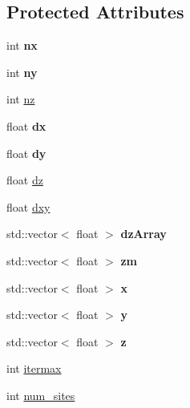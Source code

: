 \subsection*{Protected Attributes}
\begin{DoxyCompactItemize}
\item 
\mbox{\label{classSolver_aae65c28682a9953c5164cd8c6da3d69c}} 
int {\bfseries nx}
\item 
\mbox{\label{classSolver_a1f154e748c539e4cfcee150c7e155daf}} 
int {\bfseries ny}
\item 
int \hyperlink{classSolver_a4312c5a1ff7a5eba3eb8d7ef3fed0190}{nz}
\item 
\mbox{\label{classSolver_a4a3e239b59c3822b17edae555b7683d7}} 
float {\bfseries dx}
\item 
\mbox{\label{classSolver_a137aa51312a07b0ce69959dccc4ab7b6}} 
float {\bfseries dy}
\item 
float \hyperlink{classSolver_aed4366cb221b3429a878cb39a06b0ef4}{dz}
\item 
float \hyperlink{classSolver_acca22a72409a3ccff8662d0000358512}{dxy}
\item 
\mbox{\label{classSolver_a83c7c4b749580980db91770e88b2fcf5}} 
std\+::vector$<$ float $>$ {\bfseries dz\+Array}
\item 
\mbox{\label{classSolver_a4cc407bf68dc76310521a7b347e39dc0}} 
std\+::vector$<$ float $>$ {\bfseries zm}
\item 
\mbox{\label{classSolver_ad06fb03e479e8c41b1960f21e510c0d0}} 
std\+::vector$<$ float $>$ {\bfseries x}
\item 
\mbox{\label{classSolver_aa70241bd5d16502b7becb591dc141ec3}} 
std\+::vector$<$ float $>$ {\bfseries y}
\item 
\mbox{\label{classSolver_a179243358326a5c867706192597b30f3}} 
std\+::vector$<$ float $>$ {\bfseries z}
\item 
int \hyperlink{classSolver_aa42a6832b9dd82be64b07071135b69e8}{itermax}
\item 
int \hyperlink{classSolver_a0edd9bd90200b40133cc007c9f9600bb}{num\+\_\+sites}

\end{DoxyCompactItemize}
